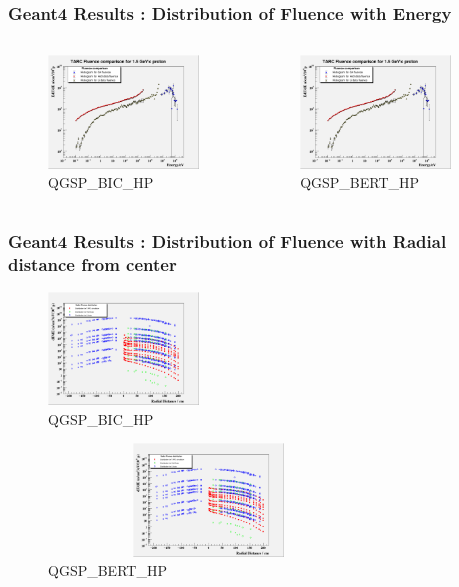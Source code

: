 \documentclass{beamer}
\begin{document}
    \begin{frame}
    \frametitle{Geant4 Results : Distribution of Fluence with Energy}
    \vskip -2mm
      \begin{columns}[c]
        \begin{figure}
        \includegraphics [height=30mm, width=60 mm] {PICS/FluenceEnergyBIC.png}
        \caption{\tiny QGSP\_BIC\_HP}
        \end{figure}

        \begin{figure}
        \includegraphics [height=30mm, width=60 mm] {PICS/FluenceEnergyBERT.png}
        \caption{\tiny QGSP\_BERT\_HP}
        \end{figure}
    \end{columns}
    \end{frame}

    \begin{frame}
    \frametitle{Geant4 Results : Distribution of Fluence with Radial distance from center}
    \vskip -2mm
    \begin{figure}
    \includegraphics [height=30mm, width=85 mm] {PICS/FluenceRadialDistBIC.png}
    \vskip -2mm
    \caption{\tiny QGSP\_BIC\_HP}
    \end{figure}
    \vskip -7mm
    \begin{figure}
    \includegraphics [height=30mm, width=85mm] {PICS/FluenceRadialDistBERT.png}
    \caption{\tiny QGSP\_BERT\_HP}
    \end{figure}
    \end{frame}
\end{document}
